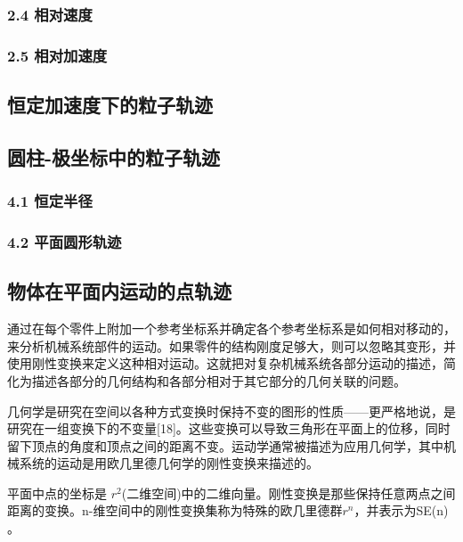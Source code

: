 \subsubsection{2.4 相对速度}



\subsubsection{2.5 相对加速度}



\subsection{恒定加速度下的粒子轨迹}



\subsection{圆柱-极坐标中的粒子轨迹}



\subsubsection{4.1 恒定半径}



\subsubsection{4.2 平面圆形轨迹}



\subsection{物体在平面内运动的点轨迹}

通过在每个零件上附加一个参考坐标系并确定各个参考坐标系是如何相对移动的，来分析机械系统部件的运动。如果零件的结构刚度足够大，则可以忽略其变形，并使用刚性变换来定义这种相对运动。这就把对复杂机械系统各部分运动的描述，简化为描述各部分的几何结构和各部分相对于其它部分的几何关联的问题。

几何学是研究在空间以各种方式变换时保持不变的图形的性质——更严格地说，是研究在一组变换下的不变量[18]。这些变换可以导致三角形在平面上的位移，同时留下顶点的角度和顶点之间的距离不变。运动学通常被描述为应用几何学，其中机械系统的运动是用欧几里德几何学的刚性变换来描述的。

平面中点的坐标是 $r^2$(二维空间)中的二维向量。刚性变换是那些保持任意两点之间距离的变换。n-维空间中的刚性变换集称为特殊的欧几里德群$r^n$，并表示为SE(n) 。

